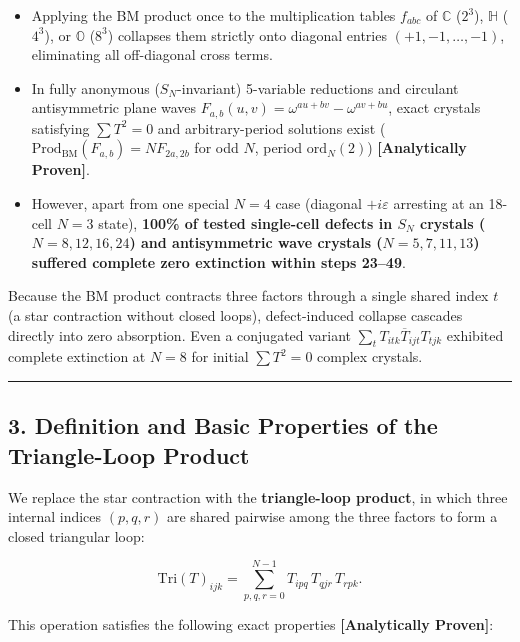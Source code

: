 \documentclass[
  a4paper,
]{article}
\providecommand{\tightlist}{%
  \setlength{\itemsep}{0pt}\setlength{\parskip}{0pt}}
\begin{document}
\begin{itemize}
\tightlist
\item
  Applying the BM product once to the multiplication tables \(f_{abc}\)
  of \(\mathbb{C}\) (\(2^3\)), \(\mathbb{H}\) (\(4^3\)), or
  \(\mathbb{O}\) (\(8^3\)) collapses them strictly onto diagonal entries
  \((+1, -1, \dots, -1)\), eliminating all off-diagonal cross terms.
\item
  In fully anonymous (\(S_N\)-invariant) 5-variable reductions and
  circulant antisymmetric plane waves
  \(F_{a,b}(u,v) = \omega^{au+bv} - \omega^{av+bu}\), exact crystals
  satisfying \(\sum T^2 = 0\) and arbitrary-period solutions exist
  (\(\mathrm{Prod}_{\mathrm{BM}}(F_{a,b}) = N F_{2a,2b}\) for odd \(N\),
  period \(\mathrm{ord}_N(2)\)) \textbf{{[}Analytically Proven{]}}.
\item
  However, apart from one special \(N = 4\) case (diagonal
  \(+i\varepsilon\) arresting at an 18-cell \(N = 3\) state),
  \textbf{100\% of tested single-cell defects in \(S_N\) crystals
  (\(N = 8, 12, 16, 24\)) and antisymmetric wave crystals
  (\(N = 5, 7, 11, 13\)) suffered complete zero extinction within steps
  23--49}.
\end{itemize}

Because the BM product contracts three factors through a single shared
index \(t\) (a star contraction without closed loops), defect-induced
collapse cascades directly into zero absorption. Even a conjugated
variant \(\sum_t T_{itk} \overline{T}_{ijt} T_{tjk}\) exhibited complete
extinction at \(N = 8\) for initial \(\sum T^2 = 0\) complex crystals.

\begin{center}\rule{0.5\linewidth}{0.5pt}\end{center}

\subsection{3. Definition and Basic Properties of the Triangle-Loop
Product}\label{definition-and-basic-properties-of-the-triangle-loop-product}

We replace the star contraction with the \textbf{triangle-loop product},
in which three internal indices \((p, q, r)\) are shared pairwise among
the three factors to form a closed triangular loop:

\[\mathrm{Tri}(T)_{ijk} = \sum_{p,q,r=0}^{N-1} T_{ipq}\, T_{qjr}\, T_{rpk}. \tag{1}\]

This operation satisfies the following exact properties
\textbf{{[}Analytically Proven{]}}:
\end{document}
